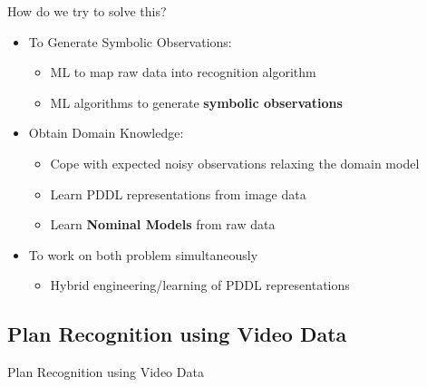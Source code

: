 \documentclass[usenames,dvipsnames]{beamer}
\begin{document}
\begin{frame}[c]{How do we try to solve this?}
	\begin{itemize}
		\item To Generate Symbolic Observations:
		\begin{itemize}
			\item ML to map raw data into recognition algorithm
			\item ML algorithms to generate \textbf{symbolic observations}
		\end{itemize}
		\item Obtain Domain Knowledge:
		\begin{itemize}
			\item Cope with expected noisy observations relaxing the domain model
			\item Learn PDDL representations from image data
			\item Learn \textbf{Nominal Models} from raw data
		\end{itemize}
		\item To work on both problem simultaneously
		\begin{itemize}
			\item Hybrid engineering/learning of PDDL representations 
		\end{itemize}
	\end{itemize}
\end{frame}

\subsection{Plan Recognition using Video Data}

\begin{frame}[c]
	\begin{center}
		\Large{Plan Recognition using Video Data}
	\end{center}
\end{frame}
\end{document}
